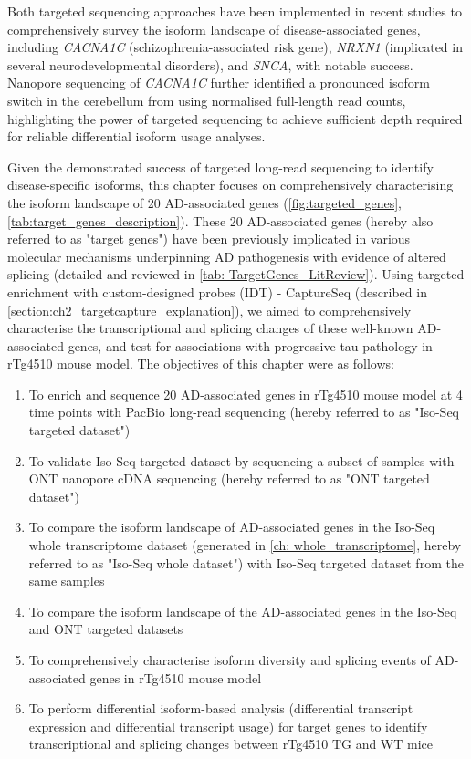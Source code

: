 Both targeted sequencing approaches have been implemented in recent studies\cite{Clark2019,Treutlein2014,Tseng2019} to comprehensively survey the isoform landscape of disease-associated genes, including \textit{CACNA1C} (schizophrenia-associated risk gene)\cite{Clark2019}, \textit{NRXN1} (implicated in several neurodevelopmental disorders)\cite{Treutlein2014}, and \textit{SNCA}\cite{Tseng2019}, with notable success. Nanopore sequencing of \textit{CACNA1C} further identified a pronounced isoform switch in the cerebellum from using normalised full-length read counts\cite{Clark2019}, highlighting the power of targeted sequencing to achieve sufficient depth required for reliable differential isoform usage analyses. 

Given the demonstrated success of targeted long-read sequencing to identify disease-specific isoforms, this chapter focuses on comprehensively characterising the isoform landscape of 20 AD-associated genes (\cref{fig:targeted_genes}, \cref{tab:target_genes_description}). These 20 AD-associated genes (hereby also referred to as "target genes") have been previously implicated in various molecular mechanisms underpinning AD pathogenesis with evidence of altered splicing (detailed and reviewed in \cref{tab: TargetGenes_LitReview}). Using targeted enrichment with custom-designed probes (IDT) - CaptureSeq (described in \cref{section:ch2_targetcapture_explanation}), we aimed to comprehensively characterise the transcriptional and splicing changes of these well-known AD-associated genes, and test for associations with progressive tau pathology in rTg4510 mouse model. The objectives of this chapter were as follows:
\begin{enumerate}
	\item To enrich and sequence 20 AD-associated genes in rTg4510 mouse model at 4 time points with PacBio long-read sequencing (hereby referred to as "Iso-Seq targeted dataset")
	\item To validate Iso-Seq targeted dataset by sequencing a subset of samples with ONT nanopore cDNA sequencing (hereby referred to as "ONT targeted dataset")
	\item To compare the isoform landscape of AD-associated genes in the Iso-Seq whole transcriptome dataset (generated in \cref{ch: whole_transcriptome}, hereby referred to as "Iso-Seq whole dataset") with Iso-Seq targeted dataset from the same samples 
	\item To compare the isoform landscape of the AD-associated genes in the Iso-Seq and ONT targeted datasets
	\item To comprehensively characterise isoform diversity and splicing events of AD-associated genes in rTg4510 mouse model 
	\item To perform differential isoform-based analysis (differential transcript expression and differential transcript usage) for target genes to identify transcriptional and splicing changes between rTg4510 TG and WT mice
\end{enumerate} 
 


